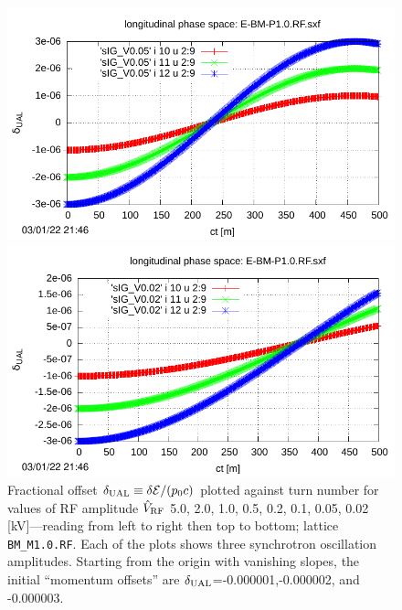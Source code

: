 \documentclass[]{article}
\begin{document}
\begin{figure}[h]
\begin{minipage}[b]{0.45\linewidth}
\end{minipage}
%
%
\begin{minipage}[b]{0.45\linewidth}
\centering
\includegraphics[scale=0.55]{pdf/delta_vs_turn_V0p05.pdf}
\end{minipage}
%
\hskip 1.5cm
%
\begin{minipage}[b]{0.45\linewidth}
\centering
\includegraphics[scale=0.55]{pdf/delta_vs_turn_V0p02.pdf}
\end{minipage}
%
\caption{\label{fig:delta_vs_turn_V}Fractional offset 
$\delta_{\rm UAL}\equiv\delta{\mathcal{E}}/(p_0c)$ 
plotted against turn number for
values of RF amplitude $\hat V_{\rm RF}$
5.0, 2.0, 1.0, 0.5, 0.2, 0.1, 0.05, 0.02 [kV]---reading from
left to right then top to bottom; lattice {\tt BM\_M1.0.RF}.
Each of the plots shows three synchrotron oscillation 
amplitudes. Starting from the origin with vanishing slopes, the
initial ``momentum offsets'' are 
$\delta_{\rm UAL}$=-0.000001,-0.000002, and -0.000003.
}
\end{figure}
%
\end{document}
